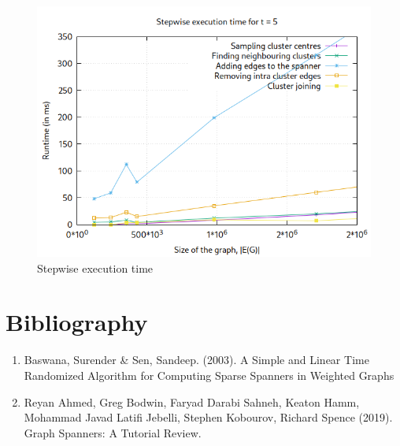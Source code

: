 \documentclass[a4paper]{article}
\begin{document}
\begin{figure}[H]
    \centering
    \includegraphics[width=.55\textwidth]{plots/2k-1-spanner/stepwise_time.png}
    \caption{Stepwise execution time}
\end{figure}

\section*{Bibliography}

\begin{enumerate}
\item Baswana, Surender & Sen, Sandeep. (2003). A Simple and Linear Time Randomized Algorithm for Computing Sparse Spanners in Weighted Graphs
\item Reyan Ahmed, Greg Bodwin, Faryad Darabi Sahneh, Keaton Hamm, Mohammad Javad Latifi Jebelli, Stephen Kobourov, Richard Spence (2019). Graph Spanners: A Tutorial Review.
\end{enumerate}
\end{document}
